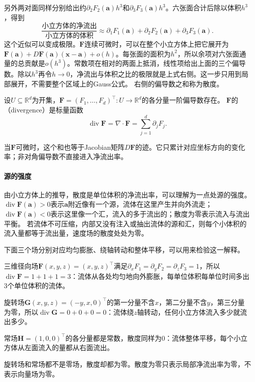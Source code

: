 另外两对面同样分别给出约$\partial_2F_2(\bm a)h^3$和$\partial_3F_3(\bm a)h^3$。六张面合计后除以体积$h^3$，得到
\[
 \frac{\text{小立方体的净流出}}{\text{小立方体的体积}}
 \approx\partial_1F_1(\bm a)+\partial_2F_2(\bm a)+\partial_3F_3(\bm a).
\]
这个近似可以变成极限。$\bm F$连续可微时，可以在整个小立方体上把它展开为$\bm F(\bm a)+D\bm F(\bm a)(\bm x-\bm a)+o(h)$。每张面的面积为$h^2$，所以余项对六张面通量的总贡献是$o(h^3)$。常数项在相对的两面上抵消，线性项给出上面的三个偏导数。除以$h^3$再令$h\to0$，净流出与体积之比的极限就是上式右侧。这一步只用到局部展开，不需要整个区域上的Gauss公式。
右侧的偏导数之和称为散度。
\begin{definition}[散度]
\label{def:multivariable-divergence}
设$U\subseteq\mathbb R^d$为开集，$\bm F=(F_1,\ldots,F_d)^\top:U\to\mathbb R^d$的各分量一阶偏导数存在。
$\bm F$的（divergence）是标量函数
\[
 \operatorname{div}\bm F
 =\nabla\mathbin{\cdot}\bm F
 =\sum_{j=1}^d\partial_jF_j.
\]
\end{definition}
当$\bm F$可微时，这个和也等于Jacobian矩阵$D\bm F$的迹。它只累计对应坐标方向的变化率；非对角偏导数不直接进入净流出率。

\paragraph{源的强度}

由小立方体上的推导，散度是单位体积的净流出率，可以理解为一点处源的强度。
$\operatorname{div}\bm F(\bm a)>0$表示$\bm a$附近像有一个源，流体在这里产生并向外流走；$\operatorname{div}\bm F(\bm a)<0$表示这里像一个汇，流入的多于流出的；散度为零表示流入与流出平衡。
若流体不可压缩，内部又没有注入或抽出流体的源和汇，则每个小体积的流入量都等于流出量，速度场的散度处处为零。

下面三个场分别对应均匀膨胀、绕轴转动和整体平移，可以用来检验这一解释。
\begin{example}
三维径向场$\bm F(x,y,z)=(x,y,z)^\top$满足$\partial_xF_1=\partial_yF_2=\partial_zF_3=1$，所以$\operatorname{div}\bm F=1+1+1=3$：流体从各处均匀地向外膨胀，每单位体积每单位时间多出$3$个单位体积的流体。

旋转场$\bm G(x,y,z)=(-y,x,0)^\top$的第一分量不含$x$，第二分量不含$y$，第三分量为零，所以$\operatorname{div}\bm G=0+0+0=0$：流体绕$z$轴转动，任何小立方体流入多少就流出多少。

常场$\bm H=(1,0,0)^\top$的各分量都是常数，散度同样为$0$：流体整体平移，每个小立方体从左面流入的量都从右面流出。
\end{example}
旋转场和常场都不是零场，散度却都为零。散度为零只表示局部净流出率为零，不表示向量场为零。

